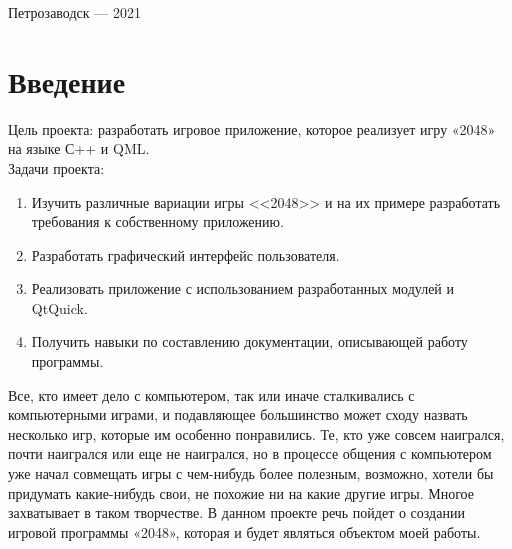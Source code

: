 \documentclass[a4paper,12pt]{article}
\begin{document}
\vfill

\begin{center}
\large
    Петрозаводск --- 2021
\end{center}



\newpage

\hypersetup{hidelinks}
\tableofcontents

\newpage
\section*{Введение}


Цель проекта: разработать игровое приложение, которое реализует игру «2048» на языке С++ и QML. \\

Задачи проекта: 
\begin{enumerate}
    \item Изучить различные вариации игры <<2048>> и на их примере разработать требования к собственному приложению.
    \item Разработать графический интерфейс пользователя.
    \item Реализовать приложение с использованием разработанных модулей и QtQuick.
    \item Получить навыки по составлению документации, описывающей работу программы. 
\end{enumerate}

Все, кто имеет дело с компьютером, так или иначе сталкивались с компьютерными играми, и подавляющее большинство может сходу назвать несколько игр, которые им особенно понравились. Те, кто уже совсем наигрался, почти наигрался или еще не наигрался, но в процессе общения с компьютером уже начал совмещать игры с чем-нибудь более полезным, возможно, хотели бы придумать какие-нибудь свои, не похожие ни на какие другие игры. Многое захватывает в таком творчестве. В данном проекте речь пойдет о создании игровой программы «2048», которая и будет являться объектом моей работы.


\newpage

\end{document}
